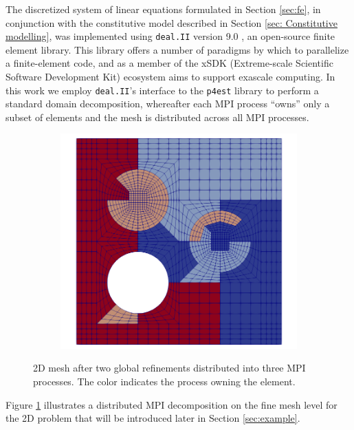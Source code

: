 \documentclass[AMA,STIX1COL]{WileyNJD-v2}
\begin{document}
The discretized system of linear equations formulated in Section \ref{sec:fe}, in conjunction with the constitutive model described in Section \ref{sec: Constitutive modelling}, was implemented using \texttt{deal.II} version 9.0 \cite{dealII90}, an open-source finite element library.
This library offers a number of paradigms by which to parallelize a finite-element code, and as a member of the xSDK (Extreme-scale Scientific Software Development Kit) ecosystem \citep{Bartlett2017b} aims to support exascale computing.
In this work we employ \texttt{deal.II}'s interface to the \texttt{p4est} \cite{p4est} library to perform a standard domain decomposition, whereafter each MPI process ``owns'' only a subset of elements and the mesh is distributed across all MPI processes.
%
\begin{figure}[!ht]
  \centering
  \begin{subfigure}[b]{0.4\textwidth}
    \centering
    \includegraphics[width=\textwidth]{fine_level_2d.png}
  \end{subfigure}
  \caption{2D mesh after two global refinements distributed into three MPI processes. The color indicates the process owning the element.}%
  \label{fig:miehe_fine_level}
\end{figure}
%
%
Figure \ref{fig:miehe_fine_level} illustrates a distributed MPI decomposition on the fine mesh level for the 2D problem that will be introduced later in Section \ref{sec:example}.
\end{document}
